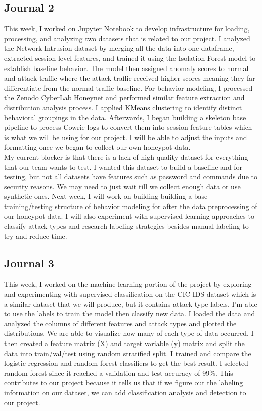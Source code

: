 \documentclass{article}
\begin{document}
\subsection{Journal 2}
\indent\indent This week, I worked on Jupyter Notebook to develop infrastructure for loading, processing, and analyzing two datasets that is related to our project. I analyzed the Network Intrusion dataset by merging all the data into one dataframe, extracted session level features, and trained it using the Isolation Forest model to establish baseline behavior. The model then assigned anomaly scores to normal and attack traffic where the attack traffic received higher scores meaning they far differentiate from the normal traffic baseline. For behavior modeling, I processed the Zenodo CyberLab Honeynet and performed similar feature extraction and distribution analysis process. I applied KMeans clustering to identify distinct behavioral groupings in the data. Afterwards, I began building a skeleton base pipeline to process Cowrie logs to convert them into session feature tables which is what we will be using for our project. I will be able to adjust the inputs and formatting once we began to collect our own honeypot data.
\\\indent My current blocker is that there is a lack of high-quality dataset for everything that our team wants to test. I wanted this dataset to build a baseline and for testing, but not all datasets have features such as password and commands due to security reasons. We may need to just wait till we collect enough data or use synthetic ones. Next week, I will work on building building a base training/testing structure of behavior modeling for after the data preprocessing of our honeypot data. I will also experiment with supervised learning approaches to classify attack types and research labeling strategies besides manual labeling to try and reduce time.
\subsection{Journal 3}
\indent \indent This week, I worked on the machine learning portion of the project by exploring and experimenting with supervised classification on the CIC-IDS dataset which is a similar dataset that we will produce, but it contains attack type labels. I'm able to use the labels to train the model then classify new data. I loaded the data and analyzed the columns of different features and attack types and plotted the distributions. We are able to visualize how many of each type of data occurred. I then created a feature matrix (X) and target variable (y) matrix and split the data into train/val/test using random stratified split. I trained and compare the logistic regression and random forest classifiers to get the best result. I selected random forest since it reached a validation and test accuracy of 99\%. This contributes to our project because it tells us that if we figure out the labeling information on our dataset, we can add classification analysis and detection to our project. 
\end{document}
